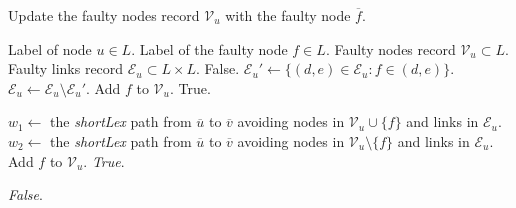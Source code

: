 \begin{algorithm}
\caption[Update the faulty nodes record.]{Update the faulty nodes record $\mathcal{V}_u$ with the faulty node $\overline{f}$.}
\label{al:nodef_rec}
\begin{algorithmic}[1]
\REQUIRE Label of node $u\in L$.
\REQUIRE Label of the faulty node $f\in L$.
\REQUIRE Faulty nodes record $\mathcal{V}_u \subset L$.
\REQUIRE Faulty links record $\mathcal{E}_u \subset L\times L$.
        \RETURN False.
    \ENDIF
    \STATE $\mathcal{E}_u'\leftarrow \{(d,e)\in\mathcal{E}_u :f\in (d,e)\}$.
    \STATE $\mathcal{E}_u\leftarrow \mathcal{E}_u\setminus \mathcal{E}_u'$.
    \STATE Add $f$ to $\mathcal{V}_u$.
    \RETURN True.
    \ENDIF
    
    \STATE $w_1\leftarrow$ the \textit{shortLex} path from $\overline{u}$ to $\overline{v}$ avoiding nodes in $\mathcal{V}_{u}\cup \{f\}$ and links in $\mathcal{E}_{u}$. 
    \STATE $w_2\leftarrow$ the \textit{shortLex} path from $\overline{u}$ to $\overline{v}$ avoiding nodes in $\mathcal{V}_{u}\setminus \{f\}$ and links in $\mathcal{E}_{u}$. 
    		\STATE Add $f$ to $\mathcal{V}_{u}$.
        	\RETURN \textit{True}.
    	\ENDIF
    \ENDFOR
   
    \RETURN \textit{False}.
\end{algorithmic}
\end{algorithm}